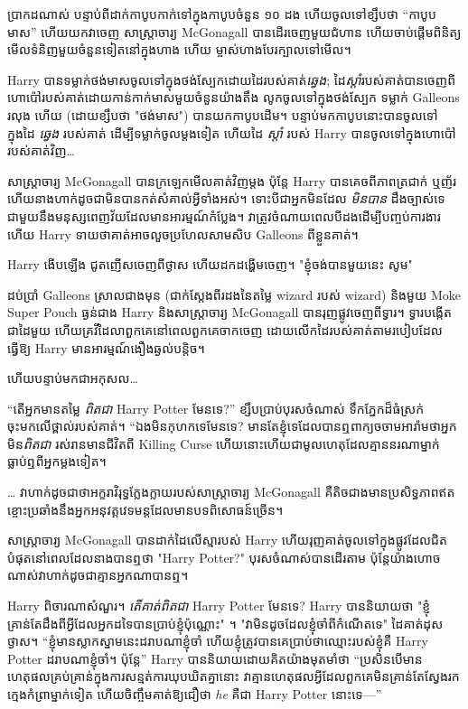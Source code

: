 ប្រាកដណាស់ បន្ទាប់ពីដាក់កាបូបកាក់ទៅក្នុងកាបូបចំនួន ១០ ដង ហើយចូលទៅខ្សឹបថា “កាបូបមាស” ហើយយកវាចេញ សាស្ត្រាចារ្យ McGonagall បានដើរចេញមួយជំហាន ហើយចាប់ផ្តើមពិនិត្យមើលទំនិញមួយចំនួនទៀតនៅក្នុងហាង ហើយ ម្ចាស់ហាងបែរក្បាលទៅមើល។

Harry បានទម្លាក់ថង់មាសចូលទៅក្នុងថង់ស្បែកដោយដៃរបស់គាត់\emph{ឆ្វេង}; ដៃ\emph{ស្តាំ}របស់គាត់បានចេញពីហោប៉ៅរបស់គាត់ដោយកាន់កាក់មាសមួយចំនួនយ៉ាងតឹង លូកចូលទៅក្នុងថង់ស្បែក ទម្លាក់ Galleons រលុង ហើយ (ដោយខ្សឹបថា "ថង់មាស") បានយកកាបូបដើម។ បន្ទាប់មកកាបូបនោះបានចូលទៅក្នុងដៃ \emph{ឆ្វេង} របស់គាត់ ដើម្បីទម្លាក់ចូលម្តងទៀត ហើយដៃ \emph{ស្តាំ} របស់ Harry បានចូលទៅក្នុងហោប៉ៅរបស់គាត់វិញ…

សាស្ត្រាចារ្យ McGonagall បានក្រឡេកមើលគាត់វិញម្តង ប៉ុន្តែ Harry បានគេចពីភាពត្រជាក់ ឬញ័រ ហើយនាងហាក់ដូចជាមិនបានកត់សំគាល់អ្វីទាំងអស់។ ទោះបីជាអ្នកមិនដែល \emph{មិនបាន} ដឹងច្បាស់ទេ ជាមួយនឹងមនុស្សពេញវ័យដែលមានអារម្មណ៍កំប្លែង។ វា​ត្រូវ​ចំណាយ​ពេល​បី​ដង​ដើម្បី​បញ្ចប់​ការងារ ហើយ Harry ទាយ​ថា​គាត់​អាច​លួច​ប្រហែល​សាមសិប Galleons ពី​ខ្លួន​គាត់។

Harry ងើបឡើង ជូតញើសចេញពីថ្ងាស ហើយដកដង្ហើមចេញ។ "ខ្ញុំចង់បានមួយនេះ សូម"

ដប់ប្រាំ Galleons ស្រាលជាងមុន (ជាក់ស្តែងពីរដងនៃតម្លៃ wizard របស់ wizard) និងមួយ Moke Super Pouch  ធ្ងន់ជាង Harry និងសាស្រ្តាចារ្យ McGonagall បានរុញផ្លូវចេញពីទ្វារ។ ទ្វារបង្កើតជាដៃមួយ ហើយគ្រវីដៃលាពួកគេនៅពេលពួកគេចាកចេញ ដោយលើកដៃរបស់គាត់តាមរបៀបដែលធ្វើឱ្យ Harry មានអារម្មណ៍ងឿងឆ្ងល់បន្តិច។

ហើយបន្ទាប់មកជាអកុសល…

“តើអ្នកមានតម្លៃ \emph{ពិតជា} Harry Potter មែនទេ?” ខ្សឹបប្រាប់បុរសចំណាស់ ទឹកភ្នែកដ៏ធំស្រក់ចុះមកលើថ្ពាល់របស់គាត់។ “ឯងមិនកុហកទេមែនទេ? មានតែខ្ញុំទេដែលបានឮពាក្យចចាមអារ៉ាមថាអ្នកមិន\emph{ពិតជា} រស់រានមានជីវិតពី Killing Curse ហើយនោះហើយជាមូលហេតុដែលគ្មាននរណាម្នាក់ធ្លាប់ឮពីអ្នកម្តងទៀត។

… វាហាក់ដូចជាថាអក្ខរាវិរុទ្ធក្លែងក្លាយរបស់សាស្រ្តាចារ្យ McGonagall គឺតិចជាងមានប្រសិទ្ធភាពឥតខ្ចោះប្រឆាំងនឹងអ្នកអនុវត្តវេទមន្តដែលមានបទពិសោធន៍ច្រើន។

សាស្ត្រាចារ្យ McGonagall បាន​ដាក់​ដៃ​លើ​ស្មា​របស់ Harry ហើយ​រុញ​គាត់​ចូល​ទៅ​ក្នុង​ផ្លូវ​ដែល​ជិត​បំផុត​នៅ​ពេល​ដែល​នាង​បាន​ឮ​ថា "Harry Potter?" បុរស​ចំណាស់​បាន​ដើរ​តាម ប៉ុន្តែ​យ៉ាង​ហោច​ណាស់​វា​ហាក់​ដូច​ជា​គ្មាន​អ្នក​ណា​បាន​ឮ។

Harry ពិចារណាសំណួរ។ \emph{តើគាត់ពិតជា} Harry Potter មែនទេ? Harry បាននិយាយថា "ខ្ញុំគ្រាន់តែដឹងពីអ្វីដែលអ្នកដទៃបានប្រាប់ខ្ញុំប៉ុណ្ណោះ" ។ "វាមិនដូចដែលខ្ញុំចាំពីកំណើតទេ" ដៃ​គាត់​ដុស​ថ្ងាស។ “ខ្ញុំមានស្លាកស្នាមនេះដរាបណាខ្ញុំចាំ ហើយខ្ញុំត្រូវបានគេប្រាប់ថាឈ្មោះរបស់ខ្ញុំគឺ Harry Potter ដរាបណាខ្ញុំចាំ។ ប៉ុន្តែ” Harry បាននិយាយដោយគិតយ៉ាងមុតមាំថា “ប្រសិនបើមានហេតុផលគ្រប់គ្រាន់ក្នុងការសន្មត់ការឃុបឃិតគ្នានោះ វាគ្មានហេតុផលអ្វីដែលពួកគេមិនគ្រាន់តែស្វែងរកក្មេងកំព្រាម្នាក់ទៀត ហើយចិញ្ចឹមគាត់ឱ្យជឿថា \emph{he} គឺជា Harry Potter នោះទេ—”

